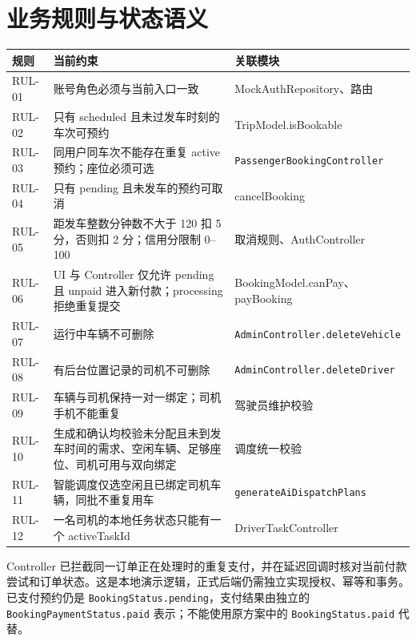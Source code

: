 \documentclass[UTF8,fontset=fandol,zihao=-4,oneside]{ctexrep}
\newcommand{\pathcode}[1]{\nolinkurl{#1}}
\begin{document}
\section{业务规则与状态语义}
\begin{longtable}{p{1.4cm}p{8.5cm}p{4.7cm}}
\toprule 规则 & 当前约束 & 关联模块 \\ \midrule
RUL-01 & 账号角色必须与当前入口一致 & MockAuthRepository、路由 \\
RUL-02 & 只有 scheduled 且未过发车时刻的车次可预约 & TripModel.isBookable \\
RUL-03 & 同用户同车次不能存在重复 active 预约；座位必须可选 & \pathcode{PassengerBookingController} \\
RUL-04 & 只有 pending 且未发车的预约可取消 & cancelBooking \\
RUL-05 & 距发车整数分钟数不大于 120 扣 5 分，否则扣 2 分；信用分限制 0--100 & 取消规则、AuthController \\
RUL-06 & UI 与 Controller 仅允许 pending 且 unpaid 进入新付款；processing 拒绝重复提交 & BookingModel.canPay、payBooking \\
RUL-07 & 运行中车辆不可删除 & \pathcode{AdminController.deleteVehicle} \\
RUL-08 & 有后台位置记录的司机不可删除 & \pathcode{AdminController.deleteDriver} \\
RUL-09 & 车辆与司机保持一对一绑定；司机手机不能重复 & 驾驶员维护校验 \\
RUL-10 & 生成和确认均校验未分配且未到发车时间的需求、空闲车辆、足够座位、司机可用与双向绑定 & 调度统一校验 \\
RUL-11 & 智能调度仅选空闲且已绑定司机车辆，同批不重复用车 & \pathcode{generateAiDispatchPlans} \\
RUL-12 & 一名司机的本地任务状态只能有一个 activeTaskId & DriverTaskController \\
\bottomrule
\end{longtable}
Controller 已拦截同一订单正在处理时的重复支付，并在延迟回调时核对当前付款尝试和订单状态。这是本地演示逻辑，正式后端仍需独立实现授权、幂等和事务。已支付预约仍是 \texttt{BookingStatus.pending}，支付结果由独立的 \texttt{BookingPaymentStatus.paid} 表示；不能使用原方案中的 \texttt{BookingStatus.paid} 代替。
\end{document}
